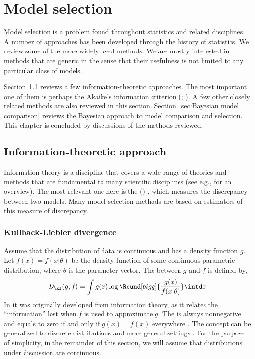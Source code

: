 \chapter{Model selection}
\label{cha:Model selection}

Model selection is a problem found throughout statistics and related disciplines. A number of approaches has been developed through the history of statistics. We review some of the more widely used methods. We are mostly interested in methods that are generic in the sense that their usefulness is not limited to any particular class of models.

Section~\ref{sec:Information theoretic approach} reviews a few information-theoretic approaches. The most important one of them is perhaps the Akaike's information criterion (\aic; \cite{Akaike:1973uc,Akaike:1974ih}). A few other closely related methods are also reviewed in this section. Section~\ref{sec:Bayesian model comparison} reviews the Bayesian approach to model comparison and selection. This chapter is concluded by discussions of the methods reviewed.

\section{Information-theoretic approach}
\label{sec:Information theoretic approach}

Information theory is a discipline that covers a wide range of theories and methods that are fundamental to many scientific disciplines (see e.g., \cite{Cover:1991vx} for an overview). The most relevant one here is the \kldfull (\kld) \cite{Kullback:1951va}, which measures the discrepancy between two models. Many model selection methods are based on estimators of this measure of discrepancy.

\subsection{Kullback-Liebler divergence}
\label{sub:Kullback-Liebler divergence}

Assume that the distribution of data is continuous and has a density function $g$. Let $f(x) = f(x|\theta)$ be the density function of some continuous parametric distribution, where $\theta$ is the parameter vector. The \kld between $g$ and $f$ is defined by,
\begin{equation}
  D_{\kl}(g,f) = \int g(x)\log\Round[bigg]{\frac{g(x)}{f(x|\theta)}}\intd x
  \label{eq:kl}
\end{equation}
In \cite{Kullback:1951va} it was originally developed from information theory, as it relates the ``information'' lost when $f$ is used to approximate $g$. The \kld is always nonnegative and equals to zero if and only if $g(x) = f(x)$ everywhere \cite[][sec.~6.8]{Burnham:2002wc}. The concept can be generalized to discrete distributions and more general settings \cite[][sec.~2.1.3]{Burnham:2002wc}. For the purpose of simplicity, in the remainder of this section, we will assume that distributions under discussion are continuous.

